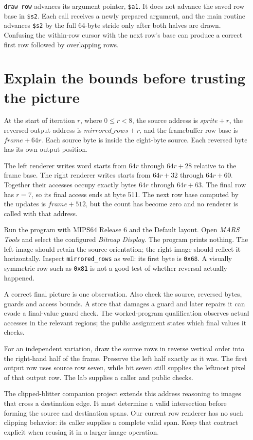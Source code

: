 \texttt{draw\_row} advances its argument pointer, \texttt{\$a1}. It does not
advance the saved row base in \texttt{\$s2}. Each call receives a newly prepared
argument, and the main routine advances \texttt{\$s2} by the full 64-byte stride
only after both halves are drawn. Confusing the within-row cursor with the next
row's base can produce a correct first row followed by overlapping rows.

\section{Explain the bounds before trusting the picture}

At the start of iteration $r$, where $0\leq r<8$, the source address is
$\textit{sprite}+r$, the reversed-output address is
$\textit{mirrored\_rows}+r$, and the framebuffer row base is
$\textit{frame}+64r$. Each source byte is inside the eight-byte source. Each
reversed byte has its own output position.

The left renderer writes word starts from $64r$ through $64r+28$ relative to the
frame base. The right renderer writes starts from $64r+32$ through $64r+60$.
Together their accesses occupy exactly bytes $64r$ through $64r+63$. The final
row has $r=7$, so its final access ends at byte 511. The next row base computed
by the updates is $\textit{frame}+512$, but the count has become zero and no
renderer is called with that address.

Run the program with MIPS64 Release 6 and the Default layout. Open
\emph{MARS Tools} and select the configured \emph{Bitmap Display}. The program
prints nothing. The left image should retain the source orientation; the right
image should reflect it horizontally. Inspect \texttt{mirrored\_rows} as well:
its first byte is \texttt{0x68}. A visually symmetric row such as \texttt{0x81}
is not a good test of whether reversal actually happened.

A correct final picture is one observation. Also check the source, reversed
bytes, guards and access bounds. A store that damages a guard and later repairs
it can evade a final-value guard check. The worked-program qualification observes
actual accesses in the relevant regions; the public assignment states which
final values it checks.

For an independent variation, draw the source rows in reverse vertical order into
the right-hand half of the frame. Preserve the left half exactly as it was. The
first output row uses source row seven, while bit seven still supplies the
leftmost pixel of that output row. The lab supplies a caller and public checks.

The clipped-blitter companion project extends this address reasoning to images
that cross a destination edge. It must determine a valid intersection before
forming the source and destination spans. Our current row renderer has no such
clipping behavior: its caller supplies a complete valid span. Keep that contract
explicit when reusing it in a larger image operation.
